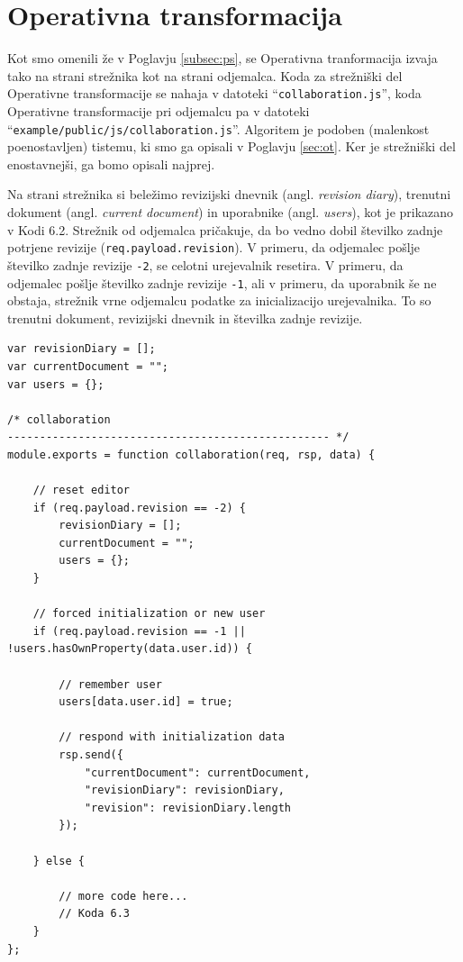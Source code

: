 \documentclass[a4paper, 12pt, twoside]{book}
\begin{document}
\section{Operativna transformacija}
\label{sec:imp-ot}

Kot smo omenili že v Poglavju \ref{subsec:ps}, se Operativna tranformacija izvaja tako na strani strežnika kot na strani odjemalca. Koda za strežniški del Operativne transformacije se nahaja v datoteki “{\tt collaboration.js}”, koda Operativne transformacije pri odjemalcu pa v datoteki “{\tt example/public/js/collaboration.js}”. Algoritem je podoben (malenkost poenostavljen) tistemu, ki smo ga opisali v Poglavju \ref{sec:ot}. Ker je strežniški del enostavnejši, ga bomo opisali najprej.

Na strani strežnika si beležimo revizijski dnevnik (angl. \textit{revision diary}), trenutni dokument (angl. \textit{current document}) in uporabnike (angl. \textit{users}), kot je prikazano v Kodi 6.2. Strežnik od odjemalca pričakuje, da bo vedno dobil številko zadnje potrjene revizije ({\tt req.payload.revision}). V primeru, da odjemalec pošlje številko zadnje revizije {\tt -2}, se celotni urejevalnik resetira. V primeru, da odjemalec pošlje številko zadnje revizije {\tt -1}, ali v primeru, da uporabnik še ne obstaja, strežnik vrne odjemalcu podatke za inicializacijo urejevalnika. To so trenutni dokument, revizijski dnevnik in številka zadnje revizije.\newline

\begin{lstlisting}[title={Koda 6.2: Strežnik odjemalcu vrne podatke za inicializacijo urejevalnika.}]
var revisionDiary = [];
var currentDocument = "";
var users = {};

/* collaboration
-------------------------------------------------- */
module.exports = function collaboration(req, rsp, data) {

    // reset editor
    if (req.payload.revision == -2) {
        revisionDiary = [];
        currentDocument = "";
        users = {};
    }

    // forced initialization or new user
    if (req.payload.revision == -1 || !users.hasOwnProperty(data.user.id)) {

        // remember user
        users[data.user.id] = true;

        // respond with initialization data
        rsp.send({
            "currentDocument": currentDocument,
            "revisionDiary": revisionDiary,
            "revision": revisionDiary.length
        });

    } else {

        // more code here...
        // Koda 6.3
    }
};
\end{lstlisting}
\end{document}
